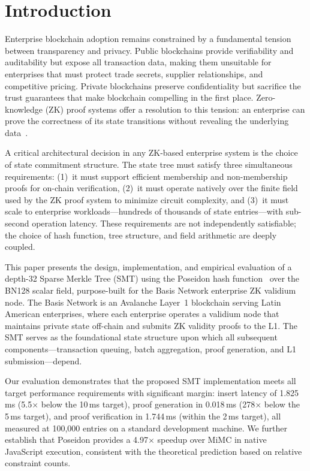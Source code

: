 
\section{Introduction}
\label{sec:introduction}

Enterprise blockchain adoption remains constrained by a fundamental tension between transparency and privacy. Public blockchains provide verifiability and auditability but expose all transaction data, making them unsuitable for enterprises that must protect trade secrets, supplier relationships, and competitive pricing. Private blockchains preserve confidentiality but sacrifice the trust guarantees that make blockchain compelling in the first place. Zero-knowledge (ZK) proof systems offer a resolution to this tension: an enterprise can prove the correctness of its state transitions without revealing the underlying data~\cite{groth2016size}.

A critical architectural decision in any ZK-based enterprise system is the choice of state commitment structure. The state tree must satisfy three simultaneous requirements: (1)~it must support efficient membership and non-membership proofs for on-chain verification, (2)~it must operate natively over the finite field used by the ZK proof system to minimize circuit complexity, and (3)~it must scale to enterprise workloads---hundreds of thousands of state entries---with sub-second operation latency. These requirements are not independently satisfiable; the choice of hash function, tree structure, and field arithmetic are deeply coupled.

This paper presents the design, implementation, and empirical evaluation of a depth-32 Sparse Merkle Tree (SMT) using the Poseidon hash function~\cite{grassi2021poseidon} over the BN128 scalar field, purpose-built for the Basis Network enterprise ZK validium node. The Basis Network is an Avalanche Layer~1 blockchain serving Latin American enterprises, where each enterprise operates a validium node that maintains private state off-chain and submits ZK validity proofs to the L1. The SMT serves as the foundational state structure upon which all subsequent components---transaction queuing, batch aggregation, proof generation, and L1 submission---depend.

Our evaluation demonstrates that the proposed SMT implementation meets all target performance requirements with significant margin: insert latency of 1.825\,ms (5.5$\times$ below the 10\,ms target), proof generation in 0.018\,ms (278$\times$ below the 5\,ms target), and proof verification in 1.744\,ms (within the 2\,ms target), all measured at 100,000 entries on a standard development machine. We further establish that Poseidon provides a 4.97$\times$ speedup over MiMC in native JavaScript execution, consistent with the theoretical prediction based on relative constraint counts.

